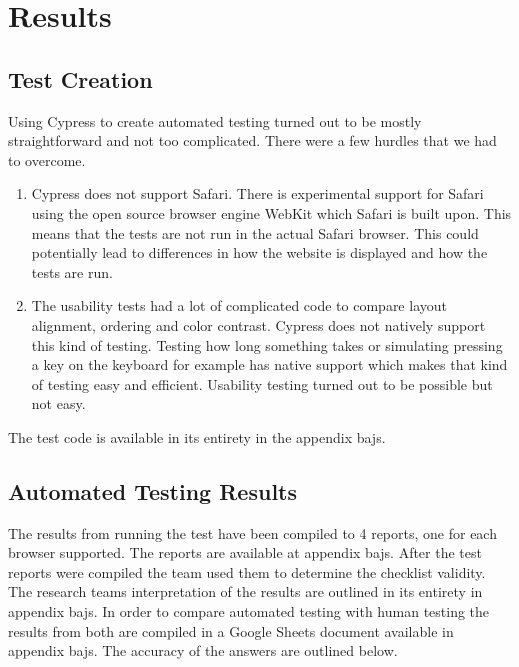 \documentclass[journal,twocolumn]{IEEEtran}
\begin{document}
\section{Results}
\subsection{Test Creation}
Using Cypress to create automated testing turned out to be mostly straightforward and not too complicated. There were a few hurdles that we had to overcome.

\begin{enumerate}
    \item Cypress does not support Safari. There is experimental support for Safari using the open source browser engine WebKit which Safari is built upon. This means that the tests are not run in the actual Safari browser. This could potentially lead to differences in how the website is displayed and how the tests are run.
    \item The usability tests had a lot of complicated code to compare layout alignment, ordering and color contrast. Cypress does not natively support this kind of testing. Testing how long something takes or simulating pressing a key on the keyboard for example has native support which makes that kind of testing easy and efficient. Usability testing turned out to be possible but not easy.
\end{enumerate}

The test code is available in its entirety in the appendix bajs. %

\subsection{Automated Testing Results}
The results from running the test have been compiled to 4 reports, one for each browser supported. The reports are available at appendix bajs. %
After the test reports were compiled the team used them to determine the checklist validity. The research teams interpretation of the results are outlined in its entirety in appendix bajs. %
In order to compare automated testing with human testing the results from both are compiled in a Google Sheets document available in appendix bajs.
The accuracy of the answers are outlined below.
\end{document}
